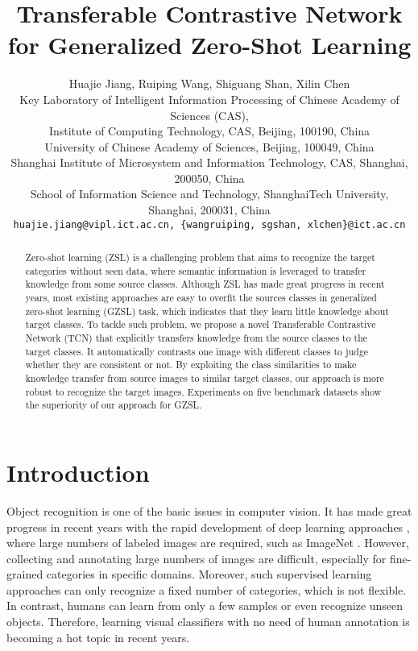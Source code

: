 \documentclass[10pt,twocolumn,letterpaper]{article}
\begin{document}
\title{Transferable Contrastive Network for Generalized Zero-Shot Learning}

\author{Huajie Jiang, Ruiping Wang, Shiguang Shan, Xilin Chen\\
 Key Laboratory of Intelligent Information Processing of Chinese Academy of Sciences (CAS),\\
Institute of Computing Technology, CAS, Beijing, 100190, China\\
 University of Chinese Academy of Sciences, Beijing, 100049, China\\
Shanghai Institute of Microsystem and Information Technology, CAS, Shanghai, 200050, China\\
School of Information Science and Technology, ShanghaiTech University, Shanghai, 200031, China\\
{\tt\small huajie.jiang@vipl.ict.ac.cn, \{wangruiping, sgshan, xlchen\}@ict.ac.cn}
}

\maketitle
\ificcvfinal\thispagestyle{empty}\fi


\begin{abstract}
Zero-shot learning (ZSL) is a challenging problem that aims to recognize the target categories without seen data, where semantic information is leveraged to transfer knowledge from some source classes. Although ZSL has made great progress in recent years, most existing approaches are easy to overfit the sources classes in generalized zero-shot learning (GZSL) task, which indicates that they learn little knowledge about target classes. To tackle such problem,  we propose a novel Transferable Contrastive Network (TCN) that explicitly transfers knowledge from the source classes to the target classes. It automatically contrasts one image with different classes to judge whether they are consistent or not. By exploiting the class similarities to make knowledge transfer from source images to similar target classes, our approach is more robust to recognize the target images. Experiments on five benchmark datasets show the superiority of our approach for GZSL.
\end{abstract}

\section{Introduction}

Object recognition is one of the basic issues in computer vision. It has made great progress in recent years with the rapid development of deep learning approaches \cite{Krizhevsky2012,Christian2015,Simonyan2014,Kaiming2016}, where large numbers of labeled images are required, such as ImageNet \cite{ILSVRC15}. However, collecting and annotating large numbers of images are difficult, especially for fine-grained categories in specific domains. Moreover, such supervised learning approaches can only recognize a fixed number of categories, which is not flexible. In contrast, humans can learn from only a few samples or even recognize unseen objects. Therefore, learning visual classifiers with no need of human annotation is becoming a hot topic in recent years.
\end{document}

